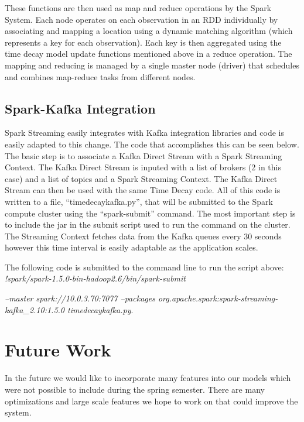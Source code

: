 \documentclass{vldb}
\begin{document}


These functions are then used as map and reduce operations by the Spark System. Each node operates on each observation in an RDD individually by associating and mapping a location using a dynamic matching algorithm (which represents a key for each observation). Each key is then aggregated using the time decay model update functions mentioned above in a reduce operation. The mapping and reducing is managed by a single master node (driver) that schedules and combines map-reduce tasks from different nodes.

\subsection{Spark-Kafka Integration}

Spark Streaming easily integrates with Kafka integration libraries and code is easily adapted to this change. The code that accomplishes this can be seen below. The basic step is to associate a Kafka Direct Stream with a Spark Streaming Context. The Kafka Direct Stream is inputed with a list of brokers (2 in this case) and a list of topics and a Spark Streaming Context. The Kafka Direct Stream can then be used with the same Time Decay code. All of this code is written to a file, ``timedecaykafka.py'', that will be submitted to the Spark compute cluster using the ``spark-submit'' command. The most important step is to include the jar in the submit script used to run the command on the cluster. The Streaming Context fetches data from the Kafka queues every 30 seconds however this time interval is easily adaptable as the application scales. 



The following code is submitted to the command line to run the script above: \textit{!spark/spark-1.5.0-bin-hadoop2.6/bin/spark-submit} 

\textit{--master spark://10.0.3.70:7077 --packages org.apache.spark:spark-streaming-kafka\_2.10:1.5.0 timedecaykafka.py}.

\section{Future Work}

In the future we would like to incorporate many features into our models which were not possible to include during the spring semester. There are many optimizations and large scale features we hope to work on that could improve the system. 
\end{document}
